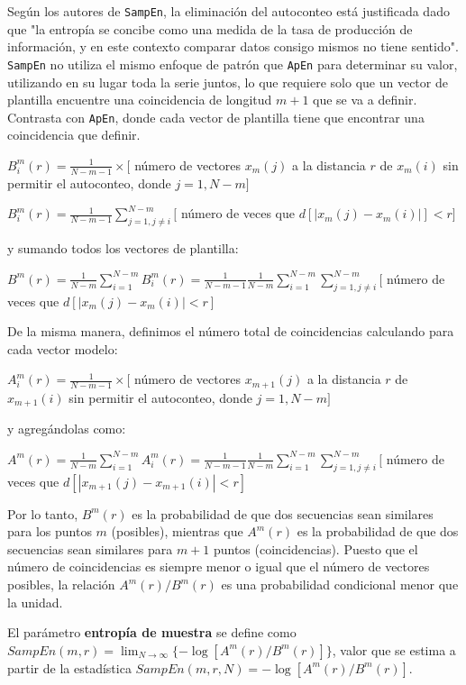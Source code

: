 \documentclass[a4paper,12pt]{article}
\begin{document}
Según los autores de \texttt{SampEn}, la eliminación del autoconteo está justificada dado que "la entropía se concibe como una medida de la tasa de producción de información, y en este contexto comparar datos consigo mismos no tiene sentido". \texttt{SampEn} no utiliza el mismo enfoque de patrón que \texttt{ApEn} para determinar su valor, utilizando en su lugar toda la serie juntos, lo que requiere solo que un vector de plantilla encuentre una coincidencia de longitud $m+1$ que se va a definir. Contrasta con \texttt{ApEn}, donde cada vector de plantilla tiene que encontrar una coincidencia que definir. 

\hfill
$ B_i^m(r) = \frac{1}{N-m-1} \times [$ número de vectores $x_m(j)$ a la distancia $r$ de $x_m(i)$ sin permitir el autoconteo, donde $j=1,N-m]$

$ B_i^m(r) = \frac{1}{N-m-1} \sum_{j=1,j \neq i}^{N-m} [$ número de veces que $d[|x_m(j)-x_m(i)|]<r]$

y sumando todos los vectores de plantilla:

$B^m(r) = \frac{1}{N-m} \sum_{i=1}^{N-m} B_i^m (r) = \frac{1}{N-m-1}\frac{1}{N-m} \sum_{i=1}^{N-m}\sum_{j=1, j \neq i}^{N-m} [$ número de veces que $d[|x_m(j)-x_m(i)|<r]$

De la misma manera, definimos el número total de coincidencias calculando para cada vector modelo:

\hfill
$ A_i^m(r) = \frac{1}{N-m-1} \times [$ número de vectores $x_{m+1}(j)$ a la distancia $r$ de $x_{m+1}(i)$ sin permitir el autoconteo, donde $j=1,N-m]$

y agregándolas como:

\hfill
$A^m(r) = \frac{1}{N-m} \sum_{i=1}^{N-m} A_i^m (r) = \frac{1}{N-m-1}\frac{1}{N-m} \sum_{i=1}^{N-m}\sum_{j=1, j \neq i}^{N-m} [$ número de veces que $d[|x_{m+1}(j)-x_{m+1}(i)|<r]$


Por lo tanto, $B^m(r)$ es la probabilidad de que dos secuencias sean similares para los puntos $m$ (posibles), mientras que $A^m(r)$ es la probabilidad de que dos secuencias sean similares para $m+1$ puntos (coincidencias). Puesto que el número de coincidencias es siempre menor o igual que el número de vectores posibles, la relación $A^m(r)/B^m(r)$ es una probabilidad condicional menor que la unidad. 

El parámetro \textbf{entropía de muestra} se define como $SampEn(m, r) = \lim_{N\to\infty}  \{− \log[ A^m(r)/B^m(r)]\}$, valor que se estima a partir de la estadística $SampEn(m,r,N)=−\log[A^m(r)/B^m(r)]$. 
\end{document}
